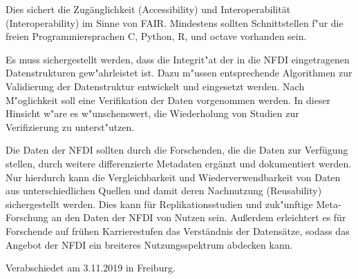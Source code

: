 \documentclass[DIV=calc]{scrartcl}
\begin{document}
Dies sichert die Zugänglichkeit (Accessibility) und Interoperabilität (Interoperability) im Sinne von FAIR.
Mindestens sollten Schnittstellen f"ur die freien Programmiersprachen C, Python, R, und octave vorhanden sein.

Es muss sichergestellt werden, dass die Integrit"at der in die NFDI eingetragenen Datenstrukturen gew"ahrleistet ist. 
Dazu m"ussen entsprechende Algorithmen zur Validierung der Datenstruktur entwickelt und eingesetzt werden. 
Nach M"oglichkeit soll eine Verifikation der Daten vorgenommen werden. 
In dieser Hinsicht w"are es w"unschenswert, die Wiederholung von Studien zur Verifizierung zu unterst"utzen. 

Die Daten der NFDI sollten durch die Forschenden, die die Daten zur Verfügung stellen, durch weitere differenzierte Metadaten ergänzt und dokumentiert werden. 
Nur hierdurch kann die Vergleichbarkeit und Wiederverwendbarkeit von Daten aus unterschiedlichen Quellen und damit deren Nachnutzung (Reusability) sichergestellt werden. Dies kann für Replikationsstudien und zuk"unftige Meta-Forschung an den Daten der NFDI von Nutzen sein. 
Außerdem erleichtert es für Forschende auf frühen Karrierestufen das Verständnis der Datensätze, sodass das Angebot der NFDI ein breiteres Nutzungsspektrum abdecken kann. 

\vfill
\begin{flushright}
	Verabschiedet am 3.11.2019 in Freiburg.
\end{flushright}
\end{document}

